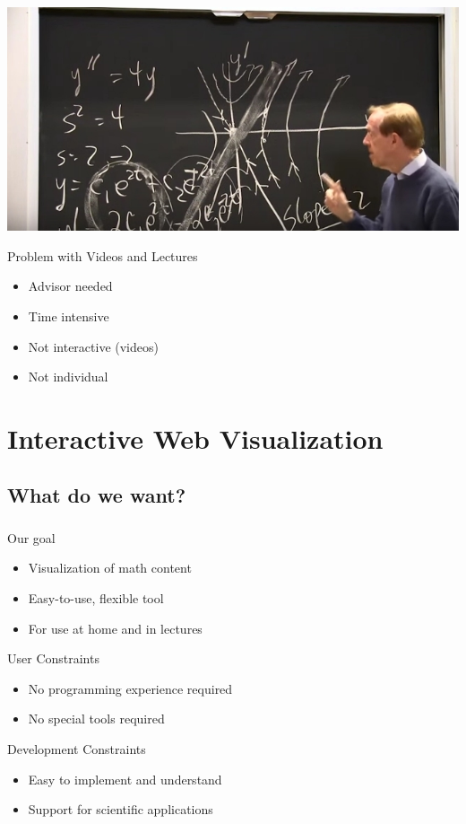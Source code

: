 \documentclass[11pt]{beamer}
\begin{document}
\begin{frame}
\frametitle{\insertsection}
\begin{center}
\includegraphics[width=.8\textwidth]{Pictures/Strang3.jpg}
\end{center}
\begin{block}{Problem with Videos and Lectures}
\begin{itemize}
\item Advisor needed
\item Time intensive
\item Not interactive (videos)
\item Not individual
\end{itemize}
\end{block}
\end{frame}

\section{Interactive Web Visualization}

\subsection{What do we want?}
\begin{frame}
\frametitle{\insertsubsection}
\begin{block}{Our goal}
\begin{itemize}
\item Visualization of math content
\item Easy-to-use, flexible tool
\item For use at home and in lectures
\end{itemize}
\end{block}
\pause
\begin{block}{User Constraints}
\begin{itemize}
\item No programming experience required
\item No special tools required
\end{itemize}
\end{block}
\pause
\begin{block}{Development Constraints}
\begin{itemize}
\item Easy to implement and understand
\item Support for scientific applications
\end{itemize}
\end{block}

\end{frame}
\end{document}
